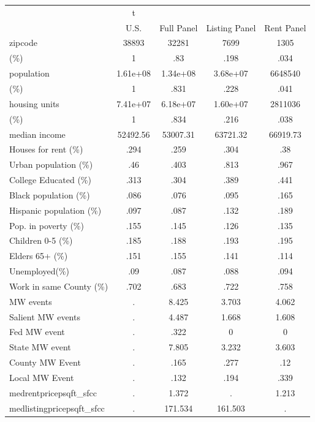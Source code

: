 \begin{tabular}{l*{4}{c}}
\hline\hline
            &           t&            &            &            \\
            &        U.S.&  Full Panel&Listing Panel&  Rent Panel\\
\hline
zipcode     &       38893&       32281&        7699&        1305\\
(\%)        &           1&         .83&        .198&        .034\\
population  &    1.61e+08&    1.34e+08&    3.68e+07&     6648540\\
(\%)        &           1&        .831&        .228&        .041\\
housing units&    7.41e+07&    6.18e+07&    1.60e+07&     2811036\\
(\%)        &           1&        .834&        .216&        .038\\
median income&    52492.56&    53007.31&    63721.32&    66919.73\\
Houses for rent (\%)&        .294&        .259&        .304&         .38\\
Urban population (\%)&         .46&        .403&        .813&        .967\\
College Educated (\%)&        .313&        .304&        .389&        .441\\
Black population (\%)&        .086&        .076&        .095&        .165\\
Hispanic population (\%)&        .097&        .087&        .132&        .189\\
Pop. in poverty (\%)&        .155&        .145&        .126&        .135\\
Children 0-5 (\%)&        .185&        .188&        .193&        .195\\
Elders 65+ (\%)&        .151&        .155&        .141&        .114\\
Unemployed(\%)&         .09&        .087&        .088&        .094\\
Work in same County (\%)&        .702&        .683&        .722&        .758\\
MW events   &           .&       8.425&       3.703&       4.062\\
Salient MW events&           .&       4.487&       1.668&       1.608\\
Fed MW event&           .&        .322&           0&           0\\
State MW event&           .&       7.805&       3.232&       3.603\\
County MW Event&           .&        .165&        .277&         .12\\
Local MW Event&           .&        .132&        .194&        .339\\
medrentpricepsqft\_sfcc&           .&       1.372&           .&       1.213\\
medlistingpricepsqft\_sfcc&           .&     171.534&     161.503&           .\\
\hline\hline
\end{tabular}
